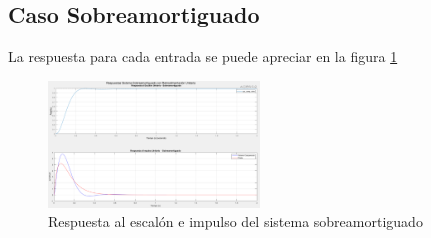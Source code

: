 \documentclass[conference]{IEEEtran}
\begin{document}
	\subsection{Caso Sobreamortiguado}
	La respuesta para cada entrada se puede apreciar en la figura \ref{fig:respuesta-sobre}
	\begin{figure}[h]
		\centering
		\includegraphics[width=0.5\textwidth]{media1/respuesta-sobre}
		\caption{Respuesta al escalón e impulso del sistema sobreamortiguado}
		\label{fig:respuesta-sobre}
	\end{figure}
	
	
	
\end{document}
